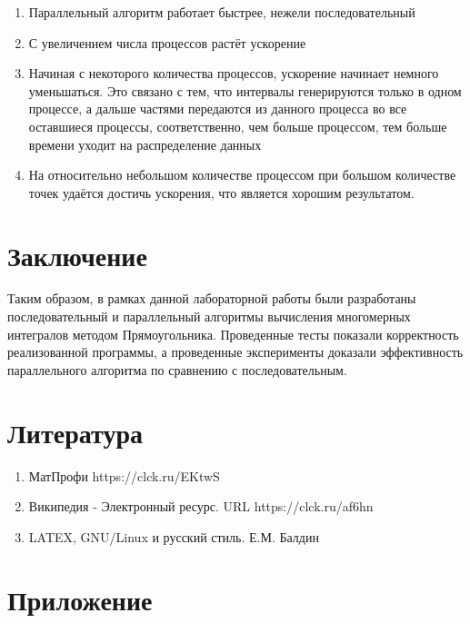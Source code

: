 \documentclass{report}
\begin{document}
\begin{enumerate}
\item Параллельный алгоритм работает быстрее, нежели последовательный
\item С увеличением числа процессов растёт ускорение
\item Начиная с некоторого количества процессов, ускорение начинает немного уменьшаться. Это связано с тем, что интервалы генерируются только в одном процессе, а дальше частями передаются из данного процесса во все оставшиеся процессы, соответственно, чем больше процессом, тем больше времени уходит на распределение данных
\item На относительно небольшом количестве процессом при большом количестве точек удаётся достичь ускорения, что является хорошим результатом.

\end{enumerate}
\newpage

\section*{Заключение}
Таким образом, в рамках данной лабораторной работы были разработаны последовательный и параллельный алгоритмы вычисления многомерных интегралов методом Прямоугольника. Проведенные тесты показали корректность реализованной программы, а проведенные эксперименты доказали эффективность параллельного алгоритма по сравнению с последовательным.
\newpage

\section*{Литература}
\begin{enumerate}
\item МатПрофи https://clck.ru/EKtwS
\item Википедия - Электронный ресурс. URL https://clck.ru/af6hn
\item LATEX, GNU/Linux и русский стиль. Е.М. Балдин
\end{enumerate} 
\newpage

\section*{Приложение}
\end{document}
